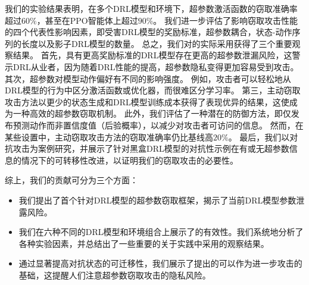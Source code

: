 我们的实验结果表明，在多个DRL模型和环境下，超参数激活函数的窃取准确率超过$60\%$，甚至在PPO智能体上超过$90\%$。
我们进一步评估了影响窃取攻击性能的四个代表性影响因素，即受害DRL模型的奖励标准，超参数耦合，状态-动作序列的长度以及影子DRL模型的数量。
总之，我们对\sysname 的实际采用获得了三个重要观察结果。
首先，具有更高奖励标准的DRL模型存在更高的超参数泄漏风险，这警示DRL从业者，因为随着DRL性能的提高，超参数隐私变得更加容易受到攻击。
其次，超参数对模型动作偏好有不同的影响强度。
例如，攻击者可以轻松地从DRL模型的行为中区分激活函数或优化器，而很难区分学习率。
第三，主动窃取攻击方法以更少的状态生成和DRL模型训练成本获得了表现优异的结果，这使\sysname 成为一种高效的超参数窃取机制。
此外，我们评估了一种潜在的防御方法，即仅发布预测动作而非置信度值（后验概率），以减少对攻击者可访问的信息。
然而，在某些设置中，主动窃取攻击方法的窃取准确率仍比基线高$20\%$。
最后，我们以对抗攻击为案例研究，并展示了针对黑盒DRL模型的对抗性示例在有或无超参数信息的情况下的可转移性改进，以证明我们的窃取攻击的必要性。

综上，我们的贡献可分为三个方面：
\begin{itemize}
\item 我们提出了首个针对DRL模型的超参数窃取框架\sysname，揭示了当前DRL模型参数泄露风险。
\item 我们在六种不同的DRL模型和环境组合上展示了\sysname 的有效性。我们系统地分析了各种实验因素，并总结出了一些重要的关于实践中采用\sysname 的观察结果。
\item 通过显著提高对抗状态的可迁移性，我们展示了提出的\sysname 可以作为进一步攻击的基础，这提醒人们注意超参数窃取攻击的隐私风险。
\end{itemize}


